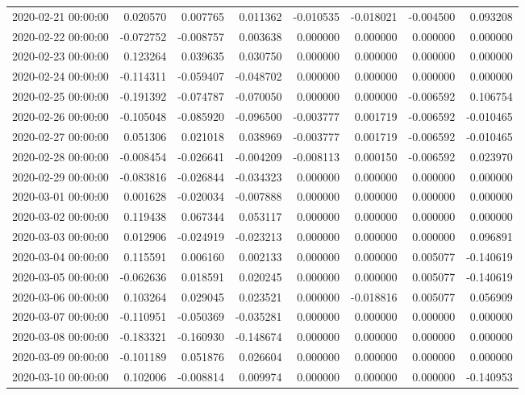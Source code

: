 \begin{tabular}{lrrrrrrr}
2020-02-21 00:00:00 & 0.020570 & 0.007765 & 0.011362 & -0.010535 & -0.018021 & -0.004500 & 0.093208 \\
2020-02-22 00:00:00 & -0.072752 & -0.008757 & 0.003638 & 0.000000 & 0.000000 & 0.000000 & 0.000000 \\
2020-02-23 00:00:00 & 0.123264 & 0.039635 & 0.030750 & 0.000000 & 0.000000 & 0.000000 & 0.000000 \\
2020-02-24 00:00:00 & -0.114311 & -0.059407 & -0.048702 & 0.000000 & 0.000000 & 0.000000 & 0.000000 \\
2020-02-25 00:00:00 & -0.191392 & -0.074787 & -0.070050 & 0.000000 & 0.000000 & -0.006592 & 0.106754 \\
2020-02-26 00:00:00 & -0.105048 & -0.085920 & -0.096500 & -0.003777 & 0.001719 & -0.006592 & -0.010465 \\
2020-02-27 00:00:00 & 0.051306 & 0.021018 & 0.038969 & -0.003777 & 0.001719 & -0.006592 & -0.010465 \\
2020-02-28 00:00:00 & -0.008454 & -0.026641 & -0.004209 & -0.008113 & 0.000150 & -0.006592 & 0.023970 \\
2020-02-29 00:00:00 & -0.083816 & -0.026844 & -0.034323 & 0.000000 & 0.000000 & 0.000000 & 0.000000 \\
2020-03-01 00:00:00 & 0.001628 & -0.020034 & -0.007888 & 0.000000 & 0.000000 & 0.000000 & 0.000000 \\
2020-03-02 00:00:00 & 0.119438 & 0.067344 & 0.053117 & 0.000000 & 0.000000 & 0.000000 & 0.000000 \\
2020-03-03 00:00:00 & 0.012906 & -0.024919 & -0.023213 & 0.000000 & 0.000000 & 0.000000 & 0.096891 \\
2020-03-04 00:00:00 & 0.115591 & 0.006160 & 0.002133 & 0.000000 & 0.000000 & 0.005077 & -0.140619 \\
2020-03-05 00:00:00 & -0.062636 & 0.018591 & 0.020245 & 0.000000 & 0.000000 & 0.005077 & -0.140619 \\
2020-03-06 00:00:00 & 0.103264 & 0.029045 & 0.023521 & 0.000000 & -0.018816 & 0.005077 & 0.056909 \\
2020-03-07 00:00:00 & -0.110951 & -0.050369 & -0.035281 & 0.000000 & 0.000000 & 0.000000 & 0.000000 \\
2020-03-08 00:00:00 & -0.183321 & -0.160930 & -0.148674 & 0.000000 & 0.000000 & 0.000000 & 0.000000 \\
2020-03-09 00:00:00 & -0.101189 & 0.051876 & 0.026604 & 0.000000 & 0.000000 & 0.000000 & 0.000000 \\
2020-03-10 00:00:00 & 0.102006 & -0.008814 & 0.009974 & 0.000000 & 0.000000 & 0.000000 & -0.140953 \\

\end{tabular}
